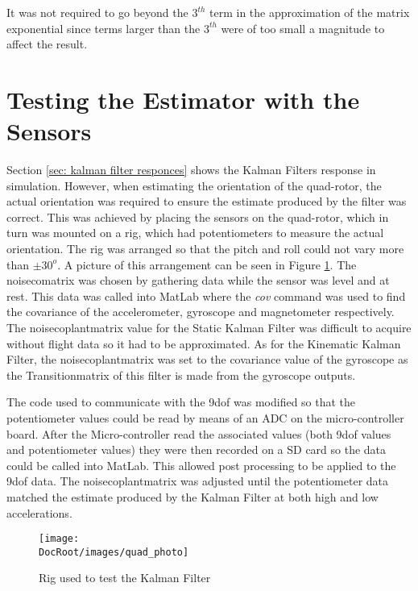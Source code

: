 It was not required to go beyond the $3^{th}$ term in the approximation of the matrix exponential since terms larger than the $3^{th}$ were of too small a magnitude to affect the result.



\section{Testing the Estimator with the Sensors}
Section \ref{sec: kalman filter responces} shows the Kalman Filters response in simulation. However, when estimating the orientation of the quad-rotor, the actual orientation was required to ensure the estimate produced by the filter was correct. This was achieved by placing the sensors on the quad-rotor, which in turn was mounted on a rig, which had potentiometers to measure the actual orientation. The rig was arranged so that the pitch and roll could not vary more than $\pm 30^o$. A picture of this arrangement can be seen in Figure \ref{Fig: test rig}. The \gls{noisecomatrix} was chosen by gathering data while the sensor was level and at rest. This data was called into MatLab where the \textit{cov} command was used to find the covariance of the accelerometer, gyroscope and magnetometer respectively. The \gls{noisecoplantmatrix} value for the Static Kalman Filter was difficult to acquire without flight data so it had to be approximated. As for the Kinematic Kalman Filter, the \gls{noisecoplantmatrix} was set to the covariance value of the gyroscope as the \gls{Transitionmatrix} of this filter is made from the gyroscope outputs. 


The code used to communicate with the \gls{9dof} was modified so that the potentiometer values could be read by means of an {ADC} on the micro-controller board. After the Micro-controller read the associated values (both \gls{9dof} values and potentiometer values) they were then recorded on a SD card so the data could be called into MatLab. This allowed post processing to be applied to the \gls{9dof} data. The \gls{noisecoplantmatrix} was adjusted until the potentiometer data matched the estimate produced by the Kalman Filter at both high and low accelerations.



\begin{figure}[h]
	\centering
	\texttt{[image: \\DocRoot/images/quad\_photo]}
	\caption{Rig used to test the Kalman Filter}
	\label{Fig: test rig}
\end{figure}



